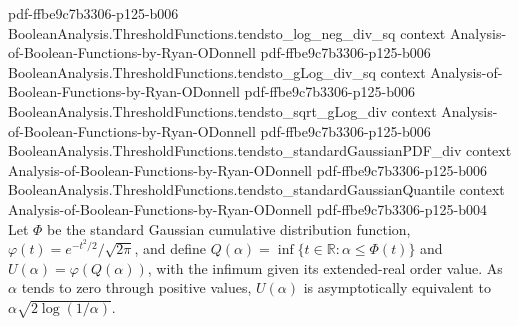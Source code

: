 \begin{theorem}
  {pdf-ffbe9c7b3306-p125-b006}
\proofstep
  {BooleanAnalysis.ThresholdFunctions.tendsto_log_neg_div_sq}
  {context}
  {Analysis-of-Boolean-Functions-by-Ryan-ODonnell}
  {pdf-ffbe9c7b3306-p125-b006}
\proofstep
  {BooleanAnalysis.ThresholdFunctions.tendsto_gLog_div_sq}
  {context}
  {Analysis-of-Boolean-Functions-by-Ryan-ODonnell}
  {pdf-ffbe9c7b3306-p125-b006}
\proofstep
  {BooleanAnalysis.ThresholdFunctions.tendsto_sqrt_gLog_div}
  {context}
  {Analysis-of-Boolean-Functions-by-Ryan-ODonnell}
  {pdf-ffbe9c7b3306-p125-b006}
\proofstep
  {BooleanAnalysis.ThresholdFunctions.tendsto_standardGaussianPDF_div}
  {context}
  {Analysis-of-Boolean-Functions-by-Ryan-ODonnell}
  {pdf-ffbe9c7b3306-p125-b006}
\proofstep
  {BooleanAnalysis.ThresholdFunctions.tendsto_standardGaussianQuantile}
  {context}
  {Analysis-of-Boolean-Functions-by-Ryan-ODonnell}
  {pdf-ffbe9c7b3306-p125-b004}
Let $\Phi$ be the standard Gaussian cumulative distribution function,
$\varphi(t)=e^{-t^2/2}/\sqrt{2\pi}$, and define $Q(\alpha)=\inf\{t\in\mathbb
R:\alpha\le\Phi(t)\}$ and $U(\alpha)=\varphi(Q(\alpha))$, with the infimum given its
extended-real order value. As $\alpha$ tends to zero through positive values,
$U(\alpha)$ is asymptotically equivalent to $\alpha\sqrt{2\log(1/\alpha)}$.
\end{theorem}
